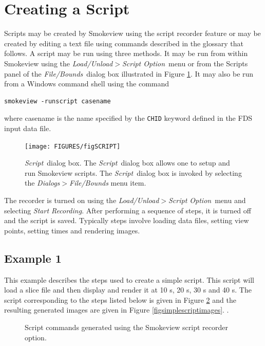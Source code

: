 \documentclass[11pt,twoside]{book}
\begin{document}
\section{Creating a Script}
Scripts may be created by Smokeview using the script recorder
feature or may be created by editing a text file using commands
described in the glossary that follows. A script may be run using
three methods.  It may be run from within Smokeview using the {\em
Load/Unload$>$Script Option}\ menu or from the Scripts panel of
the {\em File/Bounds}\ dialog box illustrated in Figure
\ref{figSCRIPT}. It may also be run from a Windows command shell
using the command

\begin{lstlisting}
smokeview -runscript casename
\end{lstlisting}

\noindent where casename is the name specified by the {\tt CHID}
keyword defined in the FDS input data file.

\begin{figure}[\figoptions]
\centerline{
\texttt{[image: FIGURES/figSCRIPT]}
} \caption[{\em Script}\ dialog box.]{{\em Script}\ dialog box.
The {\em Script}\ dialog box allows one to setup and run Smokeview
scripts. The {\em Script}\ dialog box is invoked by selecting the
{\em Dialogs$>$File/Bounds} menu item. } \label{figSCRIPT}
\end{figure}

The recorder is turned on using the
{\em Load/Unload$>$Script Option}\ menu and selecting {\em Start Recording}.
After performing a sequence of steps, it is turned off and the script is saved. Typically steps involve loading data files,
setting view points, setting times and rendering images.

\subsection{Example 1}

This example describes the steps used to create a simple script.  This script
will load a slice file and then display and render it at 10 s, 20 s, 30 s and 40 s.
The script corresponding to the steps listed below is given
in Figure \ref{figsimplescripttext} and the resulting generated images are given
in Figure \ref{figsimplescriptimages}.
.
\begin{figure}[\figoptions]
\caption{Script commands generated using the Smokeview script recorder option.}
\label{figsimplescripttext}%
\end{figure}
\end{document}
